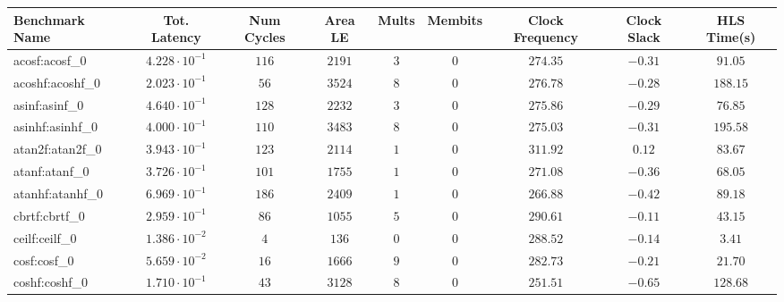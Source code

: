 \begin{tabular}{|l|c|c|c|c|c|c|c|c|}
\hline
Benchmark Name               & Tot. Latency            & Num Cycles & Area LE   & Mults   & Membits & Clock Frequency & Clock Slack & HLS Time(s) \\
\hline
acosf:acosf\_0               & $ 4.228 \cdot 10^{-1} $ & $ 116    $ & $ 2191  $ & $ 3   $ & $ 0   $ & $ 274.35      $ & $ -0.31   $ & $ 91.05   $ \\
acoshf:acoshf\_0             & $ 2.023 \cdot 10^{-1} $ & $ 56     $ & $ 3524  $ & $ 8   $ & $ 0   $ & $ 276.78      $ & $ -0.28   $ & $ 188.15  $ \\
asinf:asinf\_0               & $ 4.640 \cdot 10^{-1} $ & $ 128    $ & $ 2232  $ & $ 3   $ & $ 0   $ & $ 275.86      $ & $ -0.29   $ & $ 76.85   $ \\
asinhf:asinhf\_0             & $ 4.000 \cdot 10^{-1} $ & $ 110    $ & $ 3483  $ & $ 8   $ & $ 0   $ & $ 275.03      $ & $ -0.31   $ & $ 195.58  $ \\
atan2f:atan2f\_0             & $ 3.943 \cdot 10^{-1} $ & $ 123    $ & $ 2114  $ & $ 1   $ & $ 0   $ & $ 311.92      $ & $ 0.12    $ & $ 83.67   $ \\
atanf:atanf\_0               & $ 3.726 \cdot 10^{-1} $ & $ 101    $ & $ 1755  $ & $ 1   $ & $ 0   $ & $ 271.08      $ & $ -0.36   $ & $ 68.05   $ \\
atanhf:atanhf\_0             & $ 6.969 \cdot 10^{-1} $ & $ 186    $ & $ 2409  $ & $ 1   $ & $ 0   $ & $ 266.88      $ & $ -0.42   $ & $ 89.18   $ \\
cbrtf:cbrtf\_0               & $ 2.959 \cdot 10^{-1} $ & $ 86     $ & $ 1055  $ & $ 5   $ & $ 0   $ & $ 290.61      $ & $ -0.11   $ & $ 43.15   $ \\
ceilf:ceilf\_0               & $ 1.386 \cdot 10^{-2} $ & $ 4      $ & $ 136   $ & $ 0   $ & $ 0   $ & $ 288.52      $ & $ -0.14   $ & $ 3.41    $ \\
cosf:cosf\_0                 & $ 5.659 \cdot 10^{-2} $ & $ 16     $ & $ 1666  $ & $ 9   $ & $ 0   $ & $ 282.73      $ & $ -0.21   $ & $ 21.70   $ \\
coshf:coshf\_0               & $ 1.710 \cdot 10^{-1} $ & $ 43     $ & $ 3128  $ & $ 8   $ & $ 0   $ & $ 251.51      $ & $ -0.65   $ & $ 128.68  $ \\

\end{tabular}
